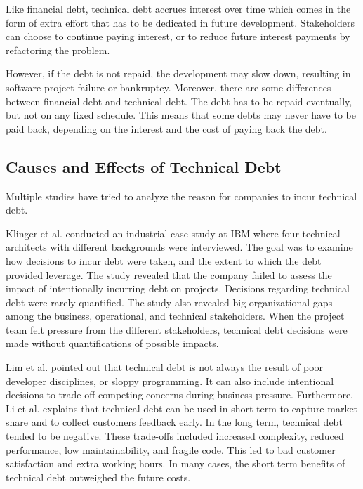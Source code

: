 {Like financial debt, technical debt accrues interest over time which comes in the form of extra effort that has to be dedicated in future development\cite{p31-guo,p35-klinger}. Stakeholders can choose to continue paying interest, or to reduce future interest payments by refactoring the problem\cite{url-fowler}. 


However, if the debt is not repaid, the development may slow down, resulting in software project failure or bankruptcy\cite{p50-allman}. Moreover, there are some differences between financial debt and technical debt. The debt has to be repaid eventually, but not on any fixed schedule\cite{p50-allman}. This means that some debts may never have to be paid back, depending on the interest and the cost of paying back the debt\cite{foser076-brown}.


\subsection{Causes and Effects of Technical Debt}
Multiple studies have tried to analyze the reason for companies to incur technical debt.

Klinger et al.\cite{p35-klinger} conducted an industrial case study at IBM where four technical architects with different backgrounds were interviewed. The goal was to examine how decisions to incur debt were taken, and the extent to which the debt provided leverage\cite{p35-klinger}. The study revealed that the company failed to assess the impact of intentionally incurring debt on projects. Decisions regarding technical debt were rarely quantified. The study also revealed big organizational gaps among the business, operational, and technical stakeholders. When the project team felt pressure from the different stakeholders, technical debt decisions were made without quantifications of possible impacts.

Lim et al.\cite{lim-taksande} pointed out that technical debt is not always the result of poor developer disciplines, or sloppy programming. It can also include intentional decisions to trade off competing concerns during business pressure. Furthermore, Li et al. explains that technical debt can be used in short term to capture market share and to collect customers feedback early. In the long term, technical debt tended to be negative. These trade-offs included increased complexity, reduced performance, low maintainability, and fragile code. This led to bad customer satisfaction and extra working hours. In many cases, the short term benefits of technical debt outweighed the future costs.

}
